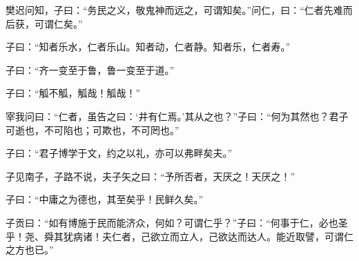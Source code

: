 \documentclass[12pt,a4paper]{ctexbook}
\begin{document}
樊迟问知，子曰：“务民之义，敬鬼神而远之，可谓知矣。”问仁，曰：“仁者先难而后获，可谓仁矣。”\par
子曰：“知者乐水，仁者乐山。知者动，仁者静。知者乐，仁者寿。”\par
子曰：“齐一变至于鲁，鲁一变至于道。”\par
子曰：“觚不觚，觚哉！觚哉！”\par
宰我问曰：“仁者，虽告之曰：‘井有仁焉。’其从之也？”子曰：“何为其然也？君子可逝也，不可陷也；可欺也，不可罔也。”\par
子曰：“君子博学于文，约之以礼，亦可以弗畔矣夫。”\par
子见南子，子路不说，夫子矢之曰：“予所否者，天厌之！天厌之！”\par
子曰：“中庸之为德也，其至矣乎！民鲜久矣。”\par
子贡曰：“如有博施于民而能济众，何如？可谓仁乎？”子曰：“何事于仁，必也圣乎！尧、舜其犹病诸！夫仁者，己欲立而立人，己欲达而达人。能近取譬，可谓仁之方也已。”\par
\end{document}
